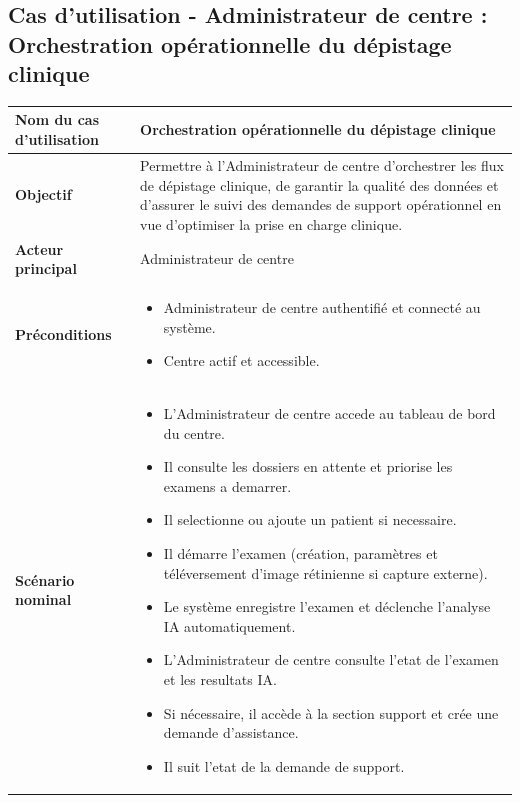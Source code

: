 \subsection{Cas d'utilisation - Administrateur de centre : Orchestration opérationnelle du dépistage clinique}
\begin{table}[H]
\centering
\renewcommand{\arraystretch}{1.3}
\begin{tabular}{|p{5cm}|p{10cm}|}
\hline
\textbf{Nom du cas d'utilisation} & Orchestration opérationnelle du dépistage clinique \\ \hline

\textbf{Objectif} & Permettre à l'Administrateur de centre d'orchestrer les flux de dépistage clinique, de garantir la qualité des données et d'assurer le suivi des demandes de support opérationnel en vue d'optimiser la prise en charge clinique. \\ \hline

\textbf{Acteur principal} & Administrateur de centre \\ \hline

\textbf{Préconditions} & 
\begin{itemize}
\item Administrateur de centre authentifié et connecté au système.
\item Centre actif et accessible.
\end{itemize} \\ \hline

\textbf{Scénario nominal} & 
\begin{itemize}
\item L'Administrateur de centre accede au tableau de bord du centre.
\item Il consulte les dossiers en attente et priorise les examens a demarrer.
\item Il selectionne ou ajoute un patient si necessaire.
\item Il démarre l'examen (création, paramètres et téléversement d'image rétinienne si capture externe).
\item Le système enregistre l'examen et déclenche l'analyse IA automatiquement.
\item L'Administrateur de centre consulte l'etat de l'examen et les resultats IA.
\item Si nécessaire, il accède à la section support et crée une demande d'assistance.
\item Il suit l'etat de la demande de support.
\end{itemize} \\\hline


\end{tabular}
\end{table}
